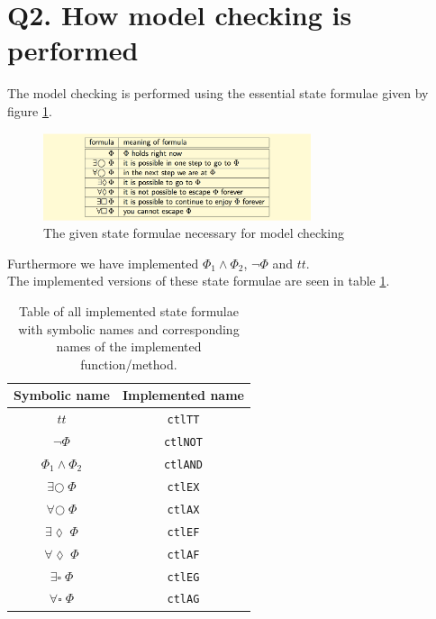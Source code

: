 \section{Q2. How model checking is performed}
\label{sec:Q2}

The model checking is performed using the essential state formulae given by figure \ref{fig:stateformulae}.

\begin{figure}[H]
    \centering
    \includegraphics[width=0.7\textwidth]{fig/stateformulae}
    \caption{The given state formulae necessary for model checking}
    \label{fig:stateformulae}
\end{figure}

Furthermore we have implemented $\Phi_1 \wedge \Phi_2$, $\neg \Phi$ and $tt$. \\

The implemented versions of these state formulae are seen in table \ref{tab:implementedformulae}.
\begin{table}[H]
    \centering
    \begin{tabular}{|c|c|}
    \hline
    Symbolic name               & Implemented name \\ \hline
    $tt$                        & \texttt{ctlTT}            \\ \hline
    $\neg \Phi$                 & \texttt{ctlNOT}           \\ \hline
    $\Phi_1 \wedge \Phi_2$      & \texttt{ctlAND}           \\ \hline
    $\exists \bigcirc \; \Phi$     & \texttt{ctlEX}            \\ \hline
    $\forall \bigcirc \; \Phi$     & \texttt{ctlAX}            \\ \hline
    $\exists \lozenge \; \Phi$     & \texttt{ctlEF}            \\ \hline
    $\forall \lozenge \; \Phi$     & \texttt{ctlAF}            \\ \hline
    $\exists \square \; \Phi$      & \texttt{ctlEG}            \\ \hline
    $\forall \square \; \Phi$      & \texttt{ctlAG}            \\ \hline
    \end{tabular}
    \caption{Table of all implemented state formulae with symbolic names and corresponding names of the implemented function/method.}
    \label{tab:implementedformulae}
\end{table}

